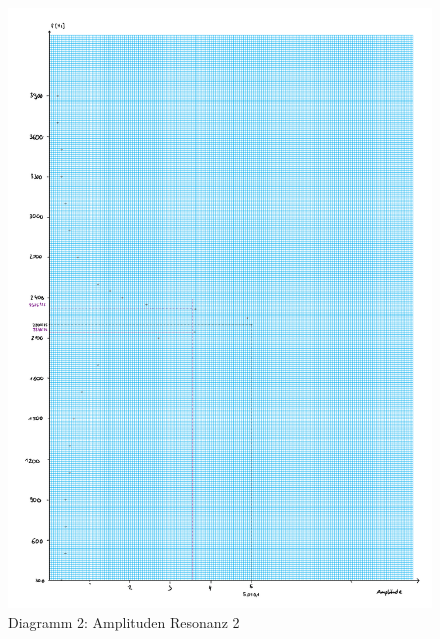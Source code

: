 \begin{figure}[h!]
    \centering
    \includegraphics[page=2, width=1\textwidth,]{Dias13.pdf}
    \caption{Diagramm 2: Amplituden Resonanz 2}
\end{figure}
\newpage
